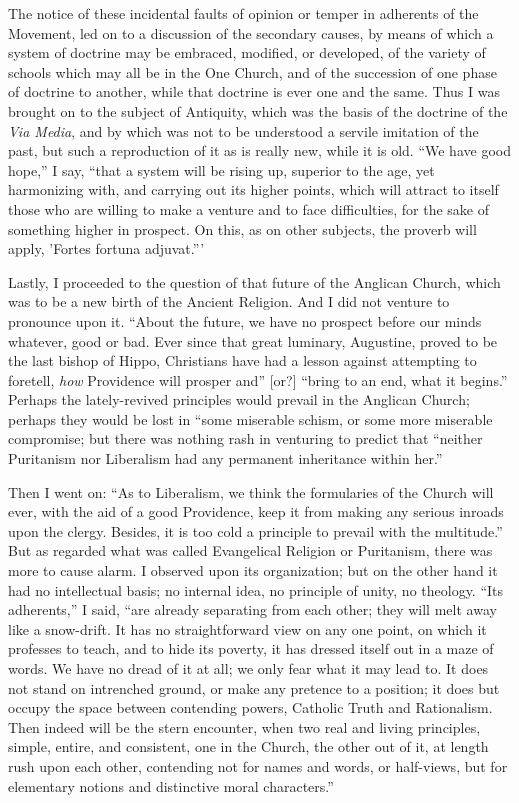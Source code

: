 The notice of these incidental faults of opinion or temper in
adherents of the Movement, led on to a discussion of the secondary
causes, by means of which a system of doctrine may be embraced,
modified, or developed, of the variety of schools which may all be in
the One Church, and of the succession of one phase of doctrine to
another, while that doctrine is ever one and the same. Thus I was brought
on to the subject of Antiquity, which was the basis of the doctrine of
the \emph{Via Media}, and by which was not to be understood a servile
imitation of the past, but such a reproduction of it as is really new, while it is old. ``We have good hope,'' I say, ``that a
system will be rising up, superior to the age, yet harmonizing with, and
carrying out its higher points, which will attract to itself those who
are willing to make a venture and to face difficulties, for the sake of
something higher in prospect. On this, as on other subjects, the proverb
will apply, 'Fortes fortuna adjuvat.'''

Lastly, I proceeded to the question of that future of the Anglican
Church, which was to be a new birth of the Ancient Religion. And I did
not venture to pronounce upon it. ``About the future, we have no
prospect before our minds whatever, good or bad. Ever since that great
luminary, Augustine, proved to be the last bishop of Hippo, Christians
have had a lesson against attempting to foretell, \emph{how} Providence
will prosper and'' [or?] ``bring to an end, what it
begins.'' Perhaps the lately-revived principles would prevail in the
Anglican Church; perhaps they would be lost in ``some miserable
schism, or some more miserable compromise; but there was nothing rash in
venturing to predict that ``neither Puritanism nor Liberalism had
any permanent inheritance within her.''

Then I went on: ``As to Liberalism, we think the
formularies of the Church will ever, with the aid of a good Providence,
keep it from making any serious inroads upon the clergy. Besides, it is
too cold a principle to prevail with the multitude.'' But as
regarded what was called Evangelical Religion or Puritanism, there was
more to cause alarm. I observed upon its organization; but on the other
hand it had no intellectual basis; no internal idea, no principle of
unity, no theology. ``Its adherents,'' I said, ``are already
separating from each other; they will melt away like a snow-drift. It
has no straightforward view on any one point, on which it professes to
teach, and to hide its poverty, it has dressed itself out in a maze of
words. We have no dread of it at all; we only fear what it may lead to.
It does not stand on intrenched ground, or make any pretence to a
position; it does but occupy the space between contending powers,
Catholic Truth and Rationalism. Then indeed will be the stern encounter,
when two real and living principles, simple, entire, and consistent, one
in the Church, the other out of it, at length rush upon each other,
contending not for names and words, or half-views, but for elementary
notions and distinctive moral characters.''

